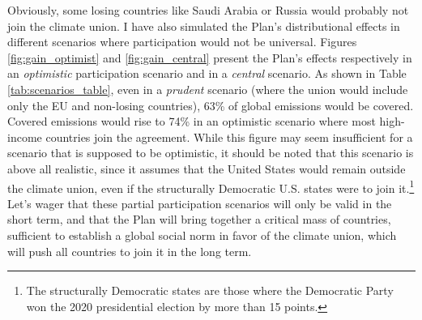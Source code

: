 \documentclass[a5paper,english,openany]{memoir}
\begin{document}
Obviously, some losing countries like Saudi Arabia or Russia would probably not join the climate union. I have also simulated the Plan's distributional effects in different scenarios where participation would not be universal. Figures \ref{fig:gain_optimist} and \ref{fig:gain_central} present the Plan's effects respectively in an \textit{optimistic} participation scenario and in a \textit{central} scenario. As shown in Table \ref{tab:scenarios_table}, even in a \textit{prudent} scenario (where the union would include only the EU and non-losing countries), 63\% of global emissions would be covered. Covered emissions would rise to 74\% in an optimistic scenario where most high-income countries join the agreement. While this figure may seem insufficient for a scenario that is supposed to be optimistic, it should be noted that this scenario is above all realistic, since it assumes that the United States would remain outside the climate union, even if the structurally Democratic U.S. states were to join it.\footnote{The structurally Democratic states are those where the Democratic Party won the 2020 presidential election by more than 15 points.} Let's wager that these partial participation scenarios will only be valid in the short term, and that the Plan will bring together a critical mass of countries, sufficient to establish a global social norm in favor of the climate union, which will push all countries to join it in the long term.
\end{document}
